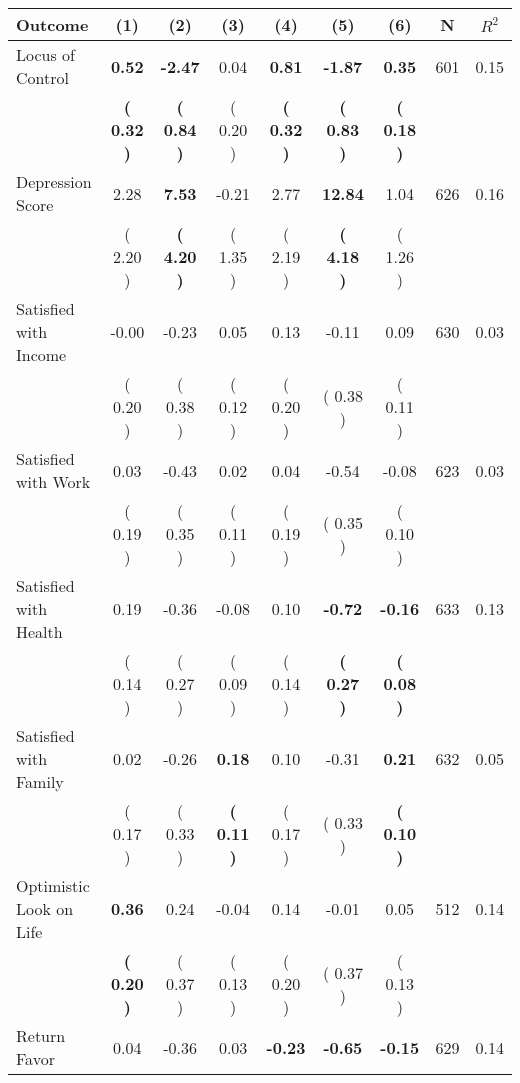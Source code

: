 \begin{tabular}{lcccccccc}
\toprule
 \textbf{Outcome} & \textbf{(1)} & \textbf{(2)} & \textbf{(3)} & \textbf{(4)} & \textbf{(5)} & \textbf{(6)} & \textbf{N} & \textbf{$ R^2$} \\
\midrule
Locus of Control & \textbf{     0.52} & \textbf{    -2.47} &      0.04 & \textbf{     0.81} & \textbf{    -1.87} & \textbf{     0.35} & 601 &       0.15 \\ 
 & \textbf{(     0.32 )} & \textbf{(     0.84 )} & (     0.20 ) & \textbf{(     0.32 )} & \textbf{(     0.83 )} & \textbf{(     0.18 )} & \\
Depression Score &      2.28 & \textbf{     7.53} &     -0.21 &      2.77 & \textbf{    12.84} &      1.04 & 626 &       0.16 \\ 
 & (     2.20 ) & \textbf{(     4.20 )} & (     1.35 ) & (     2.19 ) & \textbf{(     4.18 )} & (     1.26 ) & \\
Satisfied with Income &     -0.00 &     -0.23 &      0.05 &      0.13 &     -0.11 &      0.09 & 630 &       0.03 \\ 
 & (     0.20 ) & (     0.38 ) & (     0.12 ) & (     0.20 ) & (     0.38 ) & (     0.11 ) & \\
Satisfied with Work &      0.03 &     -0.43 &      0.02 &      0.04 &     -0.54 &     -0.08 & 623 &       0.03 \\ 
 & (     0.19 ) & (     0.35 ) & (     0.11 ) & (     0.19 ) & (     0.35 ) & (     0.10 ) & \\
Satisfied with Health &      0.19 &     -0.36 &     -0.08 &      0.10 & \textbf{    -0.72} & \textbf{    -0.16} & 633 &       0.13 \\ 
 & (     0.14 ) & (     0.27 ) & (     0.09 ) & (     0.14 ) & \textbf{(     0.27 )} & \textbf{(     0.08 )} & \\
Satisfied with Family &      0.02 &     -0.26 & \textbf{     0.18} &      0.10 &     -0.31 & \textbf{     0.21} & 632 &       0.05 \\ 
 & (     0.17 ) & (     0.33 ) & \textbf{(     0.11 )} & (     0.17 ) & (     0.33 ) & \textbf{(     0.10 )} & \\
Optimistic Look on Life & \textbf{     0.36} &      0.24 &     -0.04 &      0.14 &     -0.01 &      0.05 & 512 &       0.14 \\ 
 & \textbf{(     0.20 )} & (     0.37 ) & (     0.13 ) & (     0.20 ) & (     0.37 ) & (     0.13 ) & \\
Return Favor &      0.04 &     -0.36 &      0.03 & \textbf{    -0.23} & \textbf{    -0.65} & \textbf{    -0.15} & 629 &       0.14 \\ 

\end{tabular}
